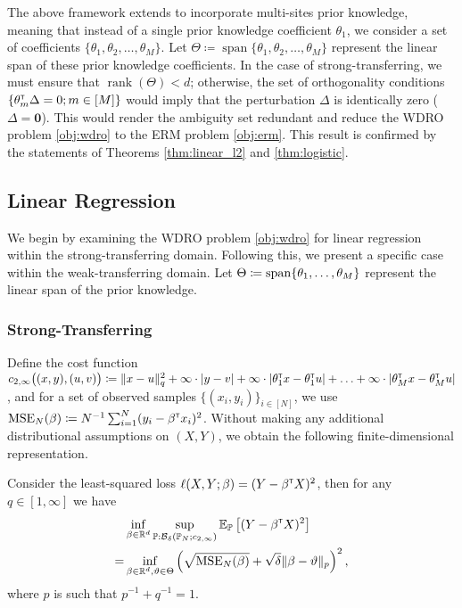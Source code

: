 \documentclass[12pt]{article}
\begin{document}
\begin{remark}
The above framework extends to incorporate multi-sites prior knowledge, meaning that instead of a single prior knowledge coefficient \(\theta_1\), we consider a set of coefficients \(\{\theta_1, \theta_2, \ldots, \theta_M\}\). Let \(\Theta \coloneqq \operatorname{span}\{\theta_1, \theta_2, \ldots, \theta_M\}\) represent the linear span of these prior knowledge coefficients. In the case of strong-transferring, we must ensure that \(\operatorname{rank}(\Theta) < d\); otherwise, the set of orthogonality conditions \(\{\theta_m^{\scriptscriptstyle \sf T} \Delta = 0; m \in [M]\}\) would imply that the perturbation \(\Delta\) is identically zero (\(\Delta = \mathbf{0}\)). This would render the ambiguity set redundant and reduce the WDRO problem \eqref{obj:wdro} to the ERM problem \eqref{obj:erm}. This result is confirmed by the statements of Theorems \ref{thm:linear_l2} and \ref{thm:logistic}.
\end{remark}

\subsection{Linear Regression}
We begin by examining the WDRO problem \eqref{obj:wdro} for linear regression within the strong-transferring domain. Following this, we present a specific case within the weak-transferring domain. Let $\Theta \coloneqq \operatorname{span}\{\theta_1, \ldots, \theta_M\}$ represent the linear span of the prior knowledge.

\subsubsection{Strong-Transferring}
Define the cost function $c_{2,\infty} \big((x,y),(u,v)\big) \coloneqq \Vert x-u\Vert_q^2 + \infty\cdot|y-v| + \infty\cdot|\theta_1^{\scriptscriptstyle \sf T} x - \theta_1^{\scriptscriptstyle \sf T} u| + \ldots + \infty \cdot |\theta_M^{\scriptscriptstyle \sf T} x - \theta_M^{\scriptscriptstyle \sf T} u|$, and for a set of observed samples $\{(x_i,y_i)\}_{i\in[N]}$, we use ${\rm MSE}_N(\beta) \coloneqq N^{-1}\sum_{i=1}^N(y_i-\beta^{\scriptscriptstyle \sf T} x_i)^2$. Without making any additional distributional assumptions on $(X, Y)$, we obtain the following finite-dimensional representation.
\begin{theorem}
\label{thm:linear_l2}
    Consider the least-squared loss $\ell(X,Y;\beta) = (Y-\beta^{\scriptscriptstyle \sf T} X)^2$, then for any $q\in[1,\infty]$ we have \begin{align*}
    &\inf_{\beta\in\mathbb{R}^d} \sup_{\mathbb{P}:\mathcal{B}_\delta(\mathbb{P}_N;c_{2,\infty})} \mathbb{E}_{\mathbb{P}}\left[(Y-\beta^{\scriptscriptstyle \sf T} X)^2\right]\\
    =&
    \inf_{\beta\in\mathbb{R}^d,\vartheta\in\Theta} \left(\sqrt{{\rm MSE}_N(\beta)} + \sqrt{\delta} \Vert \beta - \vartheta \Vert_p \right)^2,
\end{align*}
where $p$ is such that $p^{-1}+q^{-1}=1$.
\end{theorem}
\end{document}
